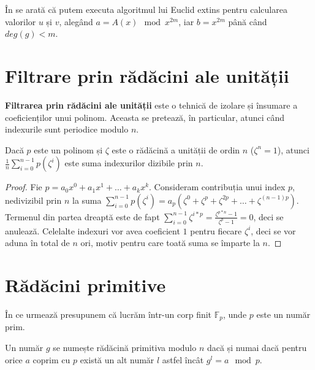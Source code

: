 În \cite{sugiyama} se arată că putem executa algoritmul lui Euclid extins pentru
calcularea valorilor $u$ și $v$, alegând $a = A(x) \mod x^{2m}$, iar
$b = x^{2m}$ până când $deg(g) < m$.

\pagebreak

\section{Filtrare prin rădăcini ale unității}

\label{rootsofunityfilter}

\textbf{Filtrarea prin rădăcini ale unității} \cite{rootsofunityfilter} este o tehnică de izolare și
însumare a coeficienților unui polinom. Aceasta se pretează, în particular,
atunci când indexurile sunt periodice modulo $n$.

\begin{thm}
  Dacă $p$ este un polinom și $\zeta$ este o rădăcină a unității de ordin
  $n$ ($\zeta^{n} = 1$), atunci $\frac{1}{n} \displaystyle\sum\limits_{i=0}^{n-1} p(\zeta^{i})$
  este suma indexurilor dizibile prin $n$.
\end{thm}

\begin{proof}
  Fie $p = a_{0}x^{0} + a_{1}x^{1} + \ldots + a_{k}x^{k}$. Consideram contribuția
  unui index $p$, nedivizibil prin $n$ la suma
  $\displaystyle\sum\limits_{i=0}^{n-1} p(\zeta^{i}) = a_{p}(\zeta^{0} + \zeta^{p} + \zeta^{2p} + \ldots + \zeta^{(n-1)p})$.
  Termenul din partea dreaptă este de fapt $\displaystyle\sum\limits_{i=0}^{n-1} \zeta^{i*p} = \frac{\zeta^{p*n} - 1}{\zeta^{p} - 1} = 0$,
  deci se anulează. Celelalte indexuri vor avea coeficient $1$ pentru fiecare
  $\zeta^{i}$, deci se vor aduna în total de $n$ ori, motiv pentru care toată suma
  se împarte la $n$.
\end{proof}


\pagebreak

\section{Rădăcini primitive}
\label{primitiveroot}

\cite{primitiveroot} În ce urmează presupunem că lucrăm într-un corp finit $\mathbb{F}_{p}$, unde $p$ este un număr prim.

\begin{defn}
  Un număr $g$ se numește rădăcină primitiva modulo $n$ dacă și numai dacă pentru orice $a$ coprim cu $p$ există un alt număr
  $l$ astfel încât $g^{l} = a \mod p$.
\end{defn}

